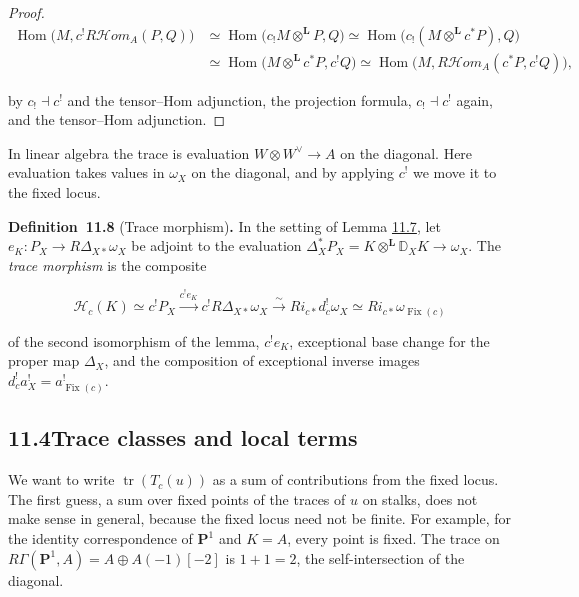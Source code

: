 \documentclass[11pt]{article}
\newenvironment{bpstatement}[2]{\par\addvspace{0.6\baselineskip}\noindent\textbf{#1}#2\textbf{.}\enspace\ignorespaces}
  {\par\addvspace{0.4\baselineskip}}
\providecommand{\Fix}{}\renewcommand{\Fix}{\operatorname{Fix}}
\providecommand{\Hom}{}\renewcommand{\Hom}{\operatorname{Hom}}
\providecommand{\cHom}{}\renewcommand{\cHom}{R\mathcal{H}\!om}
\begin{document}
\begin{proof}[{Proof}]
\[
\begin{aligned}
\Hom\bigl(M,c^!\cHom_A(P,Q)\bigr)
&\simeq\Hom\bigl(c_!M\otimes^{\mathbf L}P,Q\bigr)
\simeq\Hom\bigl(c_!(M\otimes^{\mathbf L}c^*P),Q\bigr)\\
&\simeq\Hom\bigl(M\otimes^{\mathbf L}c^*P,c^!Q\bigr)
\simeq\Hom\bigl(M,\cHom_A(c^*P,c^!Q)\bigr),
\end{aligned}
\]

by \(c_!\dashv c^!\) and the tensor–Hom adjunction, the projection formula, \(c_!\dashv c^!\) again, and the tensor–Hom adjunction.
\end{proof}

\label{bp193}%
In linear algebra the trace is evaluation \(W\otimes W^\vee\to A\) on the diagonal. Here evaluation takes values in \(\omega_X\) on the diagonal, and by applying \(c^!\) we move it to the fixed locus.

\label{bp194}%
\begin{bpstatement}{Definition~11.8}{ (Trace morphism)}
In the setting of Lemma \hyperref[bp191]{11.7}, let \(e_K:P_X\to R\Delta_{X*}\omega_X\) be adjoint to the evaluation \(\Delta_X^*P_X=K\otimes^{\mathbf L} \mathbb D_XK\to\omega_X\). The \emph{trace morphism} is the composite

\[
\mathcal H_c(K)\simeq c^!P_X\xrightarrow{c^!e_K}c^!R\Delta_{X*}\omega_X
\xrightarrow{\sim}Ri_{c*}d_c^!\omega_X
\simeq Ri_{c*}\omega_{\Fix(c)}
\]

of the second isomorphism of the lemma, \(c^!e_K\), exceptional base change for the proper map \(\Delta_X\), and the composition of exceptional inverse images \(d_c^!a_X^!=a_{\Fix(c)}^!\).
\end{bpstatement}


\subsection*{\texorpdfstring{11.4\quad Trace classes and local terms}{11.4 Trace classes and local terms}}
\label{bp195}%
\label{bp196}%
We want to write \(\operatorname{tr}(T_c(u))\) as a sum of contributions from the fixed locus. The first guess, a sum over fixed points of the traces of \(u\) on stalks, does not make sense in general, because the fixed locus need not be finite. For example, for the identity correspondence of \(\mathbf P^1\) and \(K=A\), every point is fixed. The trace on \(R\Gamma(\mathbf P^1,A)=A\oplus A(-1)[-2]\) is \(1+1=2\), the self-intersection of the diagonal.
\end{document}
